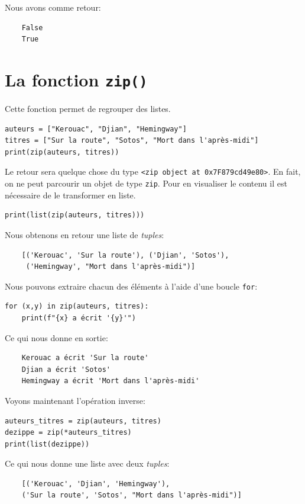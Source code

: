 \documentclass[a4paper,11pt]{book}
\begin{document}
Nous avons comme retour:
\begin{verbatim}
    False
    True
\end{verbatim}
\medskip

\section{La fonction \texttt{zip()}}
Cette fonction permet de regrouper des listes.
\begin{lstlisting}
auteurs = ["Kerouac", "Djian", "Hemingway"]
titres = ["Sur la route", "Sotos", "Mort dans l'après-midi"]
print(zip(auteurs, titres))
\end{lstlisting}
\medskip

Le retour sera quelque chose du type \texttt{<zip object at 0x7F879cd49e80>}. En fait, on ne peut parcourir un objet de type \texttt{zip}. Pour en visualiser le contenu il est nécessaire de le transformer en liste.
\begin{lstlisting}
print(list(zip(auteurs, titres)))
\end{lstlisting}
\medskip

Nous obtenons en retour une liste de \textit{tuples}:
\begin{verbatim}
    [('Kerouac', 'Sur la route'), ('Djian', 'Sotos'),
     ('Hemingway', "Mort dans l'après-midi")]
\end{verbatim}
\medskip

Nous pouvons extraire chacun des éléments à l'aide d'une boucle \texttt{for}:
\begin{lstlisting}
for (x,y) in zip(auteurs, titres):
    print(f"{x} a écrit '{y}'")
\end{lstlisting}
\medskip

Ce qui nous donne en sortie:
\begin{verbatim}
    Kerouac a écrit 'Sur la route'
    Djian a écrit 'Sotos'
    Hemingway a écrit 'Mort dans l'après-midi'
\end{verbatim}
\medskip

Voyons maintenant l'opération inverse:
\begin{lstlisting}
auteurs_titres = zip(auteurs, titres)
dezippe = zip(*auteurs_titres)
print(list(dezippe))
\end{lstlisting}
\medskip

Ce qui nous donne une liste avec deux \textit{tuples}:
\begin{verbatim}
    [('Kerouac', 'Djian', 'Hemingway'), 
    ('Sur la route', 'Sotos', "Mort dans l'après-midi")]
\end{verbatim}
\medskip
\end{document}
